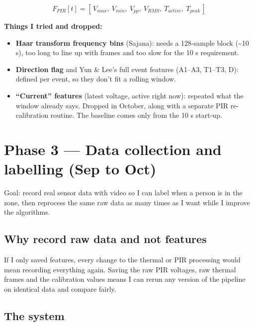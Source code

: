 \documentclass[11pt,a4paper]{article}
\providecommand{\tightlist}{\setlength{\itemsep}{0pt}\setlength{\parskip}{0pt}}
\begin{document}
\[
F_{PIR}[t] = [\,V_{max},\ V_{min},\ V_{pp},\ V_{RMS},\ T_{active},\ T_{peak}\,]
\]

\textbf{Things I tried and
dropped:}

\begin{itemize}
\tightlist
\item
  \textbf{Haar transform
  frequency bins} (Sajana):
  needs a 128-sample block
  (\textasciitilde10 s), too
  long to line up with frames
  and too slow for the 10 s
  requirement.
\item
  \textbf{Direction flag} and
  Yun \& Lee's full event
  features (A1--A3, T1--T3,
  D): defined per event, so
  they don't fit a rolling
  window.
\item
  \textbf{``Current''
  features} (latest voltage,
  active right now): repeated
  what the window already
  says. Dropped in October,
  along with a separate PIR
  re-calibration routine. The
  baseline comes only from the
  10 s start-up.
\end{itemize}

\hypertarget{phase-3-data-collection-and-labelling-sep-to-oct}{%
\section{Phase 3 --- Data
collection and labelling (Sep
to
Oct)}\label{phase-3-data-collection-and-labelling-sep-to-oct}}

Goal: record real sensor data
with video so I can label when
a person is in the zone, then
reprocess the same raw data as
many times as I want while I
improve the algorithms.

\hypertarget{why-record-raw-data-and-not-features}{%
\subsection{Why record raw
data and not
features}\label{why-record-raw-data-and-not-features}}

If I only saved features,
every change to the thermal or
PIR processing would mean
recording everything again.
Saving the raw PIR voltages,
raw thermal frames and the
calibration values means I can
rerun any version of the
pipeline on identical data and
compare fairly.

\hypertarget{the-system}{%
\subsection{The
system}\label{the-system}}
\end{document}

